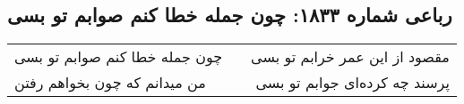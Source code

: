 \begin{center}
\section*{رباعی شماره ۱۸۳۳: چون جمله خطا کنم صوابم تو بسی}
\label{sec:1833}
\begin{longtable}{l p{0.5cm} r}
چون جمله خطا کنم صوابم تو بسی
&&
مقصود از این عمر خرابم تو بسی
\\
من میدانم که چون بخواهم رفتن
&&
پرسند چه کرده‌ای جوابم تو بسی
\\
\end{longtable}
\end{center}
